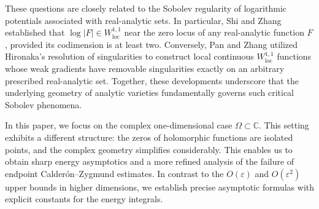 \documentclass[12pt,twoside]{amsart}
\numberwithin{equation}{section}
\numberwithin{definition}{section} %
\begin{document}
These questions are closely related to the Sobolev regularity of
logarithmic potentials associated with real-analytic sets. In particular, Shi and Zhang \cite{SZ2025} established that $\log\vert{}F\vert{} \in W^{1,1}_{\mathrm{loc}}$ near the zero locus of any real-analytic function $F$, provided its codimension is at least two. Conversely, Pan and Zhang \cite{PanZ2024} utilized Hironaka's resolution of singularities to construct local continuous $W^{1,1}_{\mathrm{loc}}$ functions whose weak gradients have removable singularities exactly on an arbitrary prescribed real-analytic set. Together, these developments underscore that the underlying geometry of analytic varieties fundamentally governs such critical Sobolev phenomena.




In this paper, we focus on the complex one-dimensional case \(\Omega \subset \mathbb{C}\). This setting exhibits a different structure: the zeros of holomorphic functions are isolated points, and the complex geometry simplifies considerably. This enables us to obtain sharp energy asymptotics and a more refined analysis of the failure of endpoint Calder\'on--Zygmund estimates. In contrast to the $O(\varepsilon)$ and $O(\varepsilon^2)$ upper bounds in higher dimensions, we establish precise asymptotic formulas with explicit constants for the energy integrals. 




\end{document}
